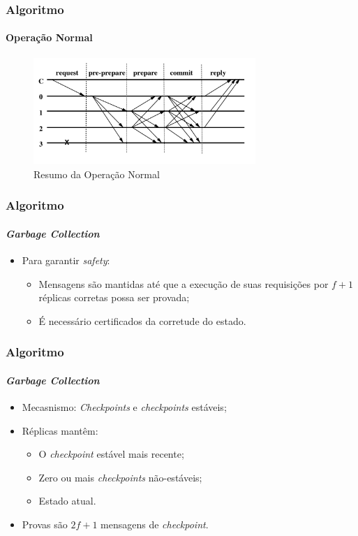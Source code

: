 \documentclass{beamer}
\begin{document}
\begin{frame}
  \frametitle{Algoritmo}
  \framesubtitle{Operação Normal}

  \begin{figure}
    \includegraphics[width=0.75\textwidth]{images/normal-case-op}
    \caption{Resumo da Operação Normal}
  \end{figure}
\end{frame}

\begin{frame}
  \frametitle{Algoritmo}
  \framesubtitle{\textit{Garbage Collection}}

  \begin{itemize}
    \item
      Para garantir \textit{safety}:
      \begin{itemize}
        \item
          Mensagens são mantidas até que a execução de suas requisições por $f + 1$ réplicas corretas possa ser provada;

        \item
          É necessário certificados da corretude do estado.
      \end{itemize}
  \end{itemize}
\end{frame}

\begin{frame}
  \frametitle{Algoritmo}
  \framesubtitle{\textit{Garbage Collection}}

  \begin{itemize}
    \item
      Mecasnismo: \textit{Checkpoints} e \textit{checkpoints} estáveis;

      \pause
    \item
      Réplicas mantêm:
      \begin{itemize}
        \item
          O \textit{checkpoint} estável mais recente;

        \item
          Zero ou mais \textit{checkpoints} não-estáveis;

        \item
          Estado atual.
      \end{itemize}

      \pause
    \item
      Provas são $2f + 1$ mensagens de \textit{checkpoint}.
  \end{itemize}
\end{frame}
\end{document}
